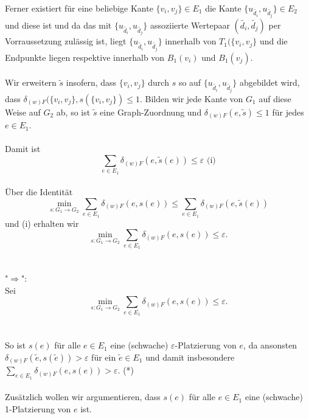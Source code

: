 \documentclass[a4paper, 12pt, twoside]{article}
\theoremstyle{Format1} %
\begin{document}
\\
Ferner existiert für eine beliebige Kante $\{v_i, v_j\} \in E_1$ die Kante $\{u_{\tilde{d_i}}, u_{\tilde{d_j}}\} \in E_2$ und diese ist
und da das mit $\{u_{\tilde{d_i}}, u_{\tilde{d_j}}\}$ assoziierte Wertepaar $(\tilde{d_i},\tilde{d_j})$ per Vorraussetzung zulässig ist,
liegt $\{u_{\tilde{d_i}}, u_{\tilde{d_j}}\}$ innerhalb von $T_1(\{v_i, v_j\}$ und die Endpunkte liegen respektive innerhalb von $B_1(v_i)$ und $B_1(v_j)$.
\\
\\
Wir erweitern $\tilde{s}$ insofern, dass $\{v_i, v_j\}$ durch $s$ so auf $\{u_{\tilde{d_i}}, u_{\tilde{d_j}}\}$ abgebildet wird,
dass $\delta_{(w)F}(\{v_i, v_j\}, s(\{v_i, v_j\}) \leq 1$. Bilden wir jede Kante von $G_1$ auf diese Weise auf $G_2$ ab, so ist $\tilde{s}$ eine Graph-Zuordnung
und $\delta_{(w)F}(e, \tilde{s}) \leq 1$ für jedes $e \in E_1$.
\\
\\
Damit ist $$\sum_{e \in E_1} \delta_{(w)F}(e, \tilde{s}(e)) \leq \varepsilon \text{ (i)} $$
\\
Über die Identität $$\min_{s: G_1 \to G_2} \sum_{e \in E_1} \delta_{(w)F}(e, s(e)) \leq \sum_{e \in E_1} \delta_{(w)F}(e,\tilde{s}(e)) $$
und (i) erhalten wir
$$\min_{s: G_1 \to G_2} \sum_{e \in E_1} \delta_{(w)F}(e, s(e)) \leq \varepsilon .$$
\\
\\
"$\Rightarrow$":
\\
Sei $$\min_{s: G_1 \to G_2} \sum_{e \in E_1} \delta_{(w)F}(e, s(e)) \leq {\varepsilon}.$$
\\
\\
So ist $s(e)$ für alle $e \in E_1$ eine (schwache) $\varepsilon$-Platzierung von $e$,
da ansonsten $\delta_{(w)F}(\tilde{e}, s(\tilde{e})) > \varepsilon$ für ein $\tilde{e} \in E_1$ und damit insbesondere $\sum_{{e}\in E_1} \delta_{(w)F}(e, s(e)) > \varepsilon$.
(*)
\\
\\
Zusätzlich wollen wir argumentieren, dass $s(e)$ für alle $e \in E_1$ eine (schwache) 1-Platzierung von $e$ ist.
\end{document}
